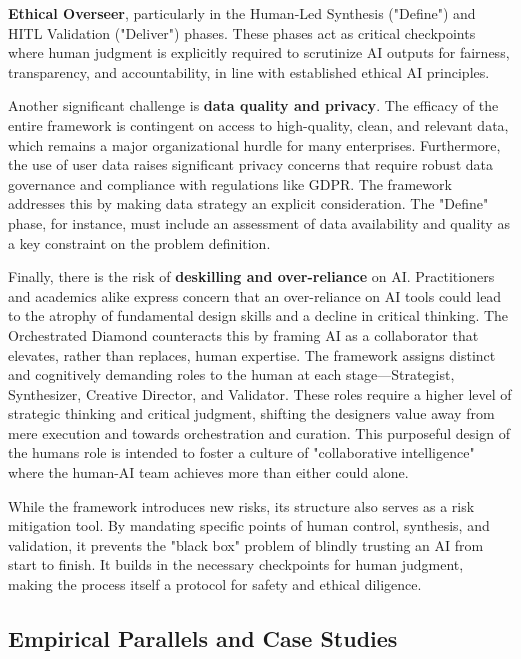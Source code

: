 \documentclass[
  12pt,
  a4paper,
  bibliography=totoc,
  numbers=noenddot
]{scrartcl}
\begin{document}
\textbf{Ethical Overseer}, particularly in the Human-Led Synthesis
("Define") and HITL Validation ("Deliver") phases. These phases act as
critical checkpoints where human judgment is explicitly required to
scrutinize AI outputs for fairness, transparency, and accountability, in
line with established ethical AI principles.\cite{unesco2025ethics}

Another significant challenge is \textbf{data quality and privacy}. The
efficacy of the entire framework is contingent on access to
high-quality, clean, and relevant data, which remains a major
organizational hurdle for many enterprises.\cite{researchgate2025design}
Furthermore, the use of user data raises significant privacy concerns
that require robust data governance and compliance with regulations like
GDPR.\cite{ideou2025intersection} The framework addresses this by making data
strategy an explicit consideration. The "Define" phase, for instance,
must include an assessment of data availability and quality as a key
constraint on the problem definition.

Finally, there is the risk of \textbf{deskilling and over-reliance} on
AI. Practitioners and academics alike express concern that an
over-reliance on AI tools could lead to the atrophy of fundamental
design skills and a decline in critical thinking.\cite{ipm2025impact}
The Orchestrated Diamond counteracts this by framing AI as a
collaborator that elevates, rather than replaces, human expertise. The
framework assigns distinct and cognitively demanding roles to the human
at each stage---Strategist, Synthesizer, Creative Director, and
Validator. These roles require a higher level of strategic thinking and
critical judgment, shifting the designer\textquotesingle s value away
from mere execution and towards orchestration and curation. This
purposeful design of the human\textquotesingle s role is intended to
foster a culture of "collaborative intelligence" where the human-AI team
achieves more than either could alone.\cite{tandfonline2025collaborative}

While the framework introduces new risks, its structure also serves as a
risk mitigation tool. By mandating specific points of human control,
synthesis, and validation, it prevents the "black box" problem of
blindly trusting an AI from start to finish. It builds in the necessary
checkpoints for human judgment, making the process itself a protocol for
safety and ethical diligence.

\subsection{Empirical Parallels and Case
Studies}\label{empirical-parallels-and-case-studies}
\end{document}
